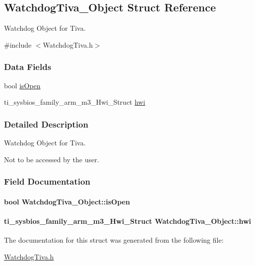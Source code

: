 \subsection{Watchdog\+Tiva\+\_\+\+Object Struct Reference}
\label{struct_watchdog_tiva___object}


Watchdog Object for Tiva.  




{\ttfamily \#include $<$Watchdog\+Tiva.\+h$>$}

\subsubsection*{Data Fields}
\begin{DoxyCompactItemize}
\item 
bool \hyperlink{struct_watchdog_tiva___object_ae0d4184d8bf76a7db3ca4e7ef5252dbd}{is\+Open}
\item 
ti\+\_\+sysbios\+\_\+family\+\_\+arm\+\_\+m3\+\_\+\+Hwi\+\_\+\+Struct \hyperlink{struct_watchdog_tiva___object_a2b8d42f5107ecf7fa883f1eebd687f11}{hwi}
\end{DoxyCompactItemize}


\subsubsection{Detailed Description}
Watchdog Object for Tiva. 

Not to be accessed by the user. 

\subsubsection{Field Documentation}
\paragraph[{is\+Open}]{\setlength{\rightskip}{0pt plus 5cm}bool Watchdog\+Tiva\+\_\+\+Object\+::is\+Open}\label{struct_watchdog_tiva___object_ae0d4184d8bf76a7db3ca4e7ef5252dbd}
\paragraph[{hwi}]{\setlength{\rightskip}{0pt plus 5cm}ti\+\_\+sysbios\+\_\+family\+\_\+arm\+\_\+m3\+\_\+\+Hwi\+\_\+\+Struct Watchdog\+Tiva\+\_\+\+Object\+::hwi}\label{struct_watchdog_tiva___object_a2b8d42f5107ecf7fa883f1eebd687f11}


The documentation for this struct was generated from the following file\+:\begin{DoxyCompactItemize}
\item 
\hyperlink{_watchdog_tiva_8h}{Watchdog\+Tiva.\+h}\end{DoxyCompactItemize}
